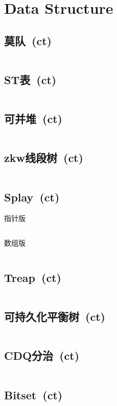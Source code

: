 \chapter{Data Structure}
\section{莫队\ \small(ct)}
\inputminted{cpp}{DataStructure/mo_dui.cpp}
\section{ST表\ \small(ct)}
\inputminted{cpp}{DataStructure/st_table.cpp}
\section{可并堆\ \small(ct)}
\inputminted{cpp}{DataStructure/mergeable_heap.cpp}
\section{zkw线段树\ \small(ct)}
\inputminted{cpp}{DataStructure/zkw_segment_tree.cpp}
\section{Splay\ \small(ct)}
指针版
\inputminted{cpp}{DataStructure/splay.cpp}
数组版
\inputminted{cpp}{DataStructure/splay_arr.cpp}
\section{Treap\ \small(ct)}
\inputminted{cpp}{DataStructure/treap.cpp}
\section{可持久化平衡树\ \small(ct)}
\inputminted{cpp}{DataStructure/functional_treap.cpp}
\section{CDQ分治\ \small(ct)}
\inputminted{cpp}{DataStructure/cdq_divide.cpp}
\section{Bitset\ \small(ct)}
\inputminted{cpp}{DataStructure/bitset.cpp}